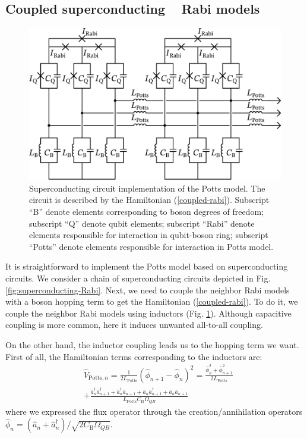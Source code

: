 \documentclass[reprint, aps, prx, amsmath, amssymb, longbibliography, superscriptaddress]{revtex4-2}
\DeclareMathOperator{\Zthree}{\mathbb{Z}_3}
\begin{document}
\subsection{Coupled superconducting \texorpdfstring{$\Zthree$}{Z3} Rabi models}


\begin{figure}[t]
    \includegraphics[width=\linewidth]{pics/SC_Potts_circuit_new_svg-tex.pdf}
    \caption{Superconducting circuit implementation of the Potts model. The circuit is described by the Hamiltonian (\ref{coupled-rabi}). Subscript ``B'' denote elements corresponding to boson degrees of freedom; subscript ``Q'' denote qubit elements; subscript ``Rabi'' denote elements responsible for interaction in qubit-boson ring; subscript ``Potts'' denote elements responsible for interaction in Potts model.}
    \label{fig:superconducting-potts}
\end{figure}

It is straightforward to implement the Potts model based on superconducting circuits. We consider a chain of superconducting circuits depicted in Fig. \ref{fig:superconducting-Rabi}. Next, we need to couple the neighbor Rabi models with a boson hopping term to get the Hamiltonian (\ref{coupled-rabi}). To do it, we couple the neighbor Rabi models using inductors (Fig. \ref{fig:superconducting-potts}). Although capacitive coupling is more common, here it induces unwanted  all-to-all coupling.

On the other hand, the inductor coupling leads us to the hopping term we want. First of all, the Hamiltonian terms corresponding to the inductors are:
\begin{equation}
\begin{aligned}
    &\hat V_{\text{Potts},n} = \frac{1}{2L_{\text{Potts}}} (\hat \phi_{n+1} - \hat \phi_n)^2 = \frac{\hat \phi_n^2 + \hat \phi_{n+1}^2}{2L_{\text{Potts}}} \\
    &+ \frac{\hat a^{\dagger}_n \hat a^{\dagger}_{n+1} + \hat a^{\dagger}_n \hat a_{n+1} + \hat a_n \hat a^{\dagger}_{n+1} + \hat a_n \hat a_{n+1}}{L_{\text{Potts}}C_{\text{B}}\Omega_{QB}} 
\end{aligned}
\end{equation}
where we expressed the flux operator through the creation/annihilation operators $\hat \phi_n = (\hat a_n + \hat a_n^{\dagger})/\sqrt{2C_{\text{B}} \Omega_{QB}}$.
\end{document}
